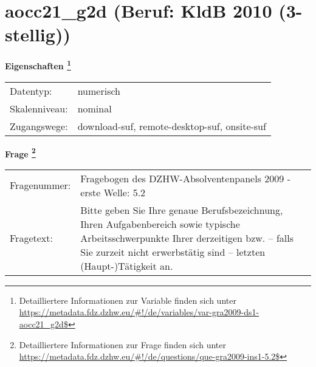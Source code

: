 
    \setcounter{footnote}{0}

    \vspace*{-1.8cm}
	\section{aocc21\_g2d (Beruf: KldB 2010 (3-stellig))}
	\label{section:aocc21_g2d}



    \vspace*{0.5cm}
    \noindent\textbf{Eigenschaften
	\footnote{Detailliertere Informationen zur Variable finden sich unter
		\url{https://metadata.fdz.dzhw.eu/\#!/de/variables/var-gra2009-ds1-aocc21_g2d$}}}\\
	\begin{tabularx}{\hsize}{@{}lX}
	Datentyp: & numerisch \\
	Skalenniveau: & nominal \\
	Zugangswege: &
	  download-suf, 
	  remote-desktop-suf, 
	  onsite-suf
 \\
    \end{tabularx}



				\vspace*{0.5cm}
                \noindent\textbf{Frage
	                \footnote{Detailliertere Informationen zur Frage finden sich unter
		              \url{https://metadata.fdz.dzhw.eu/\#!/de/questions/que-gra2009-ins1-5.2$}}}\\
				\begin{tabularx}{\hsize}{@{}lX}
					Fragenummer: &
					  Fragebogen des DZHW-Absolventenpanels 2009 - erste Welle:
					  5.2
 \\
					Fragetext: & Bitte geben Sie Ihre genaue Berufsbezeichnung, Ihren Aufgabenbereich sowie typische Arbeitsschwerpunkte Ihrer derzeitigen bzw. – falls Sie zurzeit nicht erwerbstätig sind – letzten (Haupt-)Tätigkeit an. \\
				\end{tabularx}





